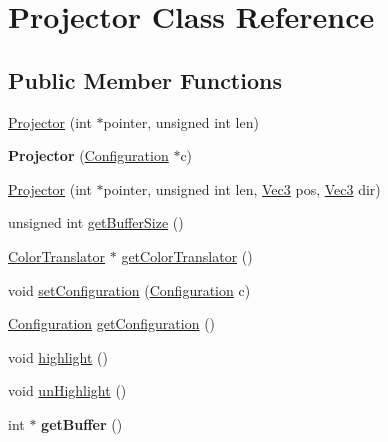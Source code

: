 \hypertarget{classProjector}{
\section{Projector Class Reference}
\label{classProjector}
}
\subsection*{Public Member Functions}
\begin{DoxyCompactItemize}
\item 
\hyperlink{classProjector_ac3b7b98ff0014b2c94f1f0038381f78a}{Projector} (int $\ast$pointer, unsigned int len)
\item 
\hypertarget{classProjector_a81eb429cd0c4659149a563bf7aaba8f5}{
{\bfseries Projector} (\hyperlink{classConfiguration}{Configuration} $\ast$c)}
\label{classProjector_a81eb429cd0c4659149a563bf7aaba8f5}

\item 
\hyperlink{classProjector_a39d6c9ed1b6cb029aaf7df4586e6af8a}{Projector} (int $\ast$pointer, unsigned int len, \hyperlink{structVec3}{Vec3} pos, \hyperlink{structVec3}{Vec3} dir)
\item 
unsigned int \hyperlink{classProjector_a8714a339afd4da16f7949dfde0c30b0a}{getBufferSize} ()
\item 
\hyperlink{classColorTranslator}{ColorTranslator} $\ast$ \hyperlink{classProjector_aaf340dde1e1a590742200007e4aecd02}{getColorTranslator} ()
\item 
void \hyperlink{classProjector_a500a8dbee7f243014dc9e8487fee69db}{setConfiguration} (\hyperlink{classConfiguration}{Configuration} c)
\item 
\hyperlink{classConfiguration}{Configuration} \hyperlink{classProjector_a54417b48fb015e507628d5feb75bfccc}{getConfiguration} ()
\item 
void \hyperlink{classProjector_a81a631412be8114bde82a155eab5279a}{highlight} ()
\item 
void \hyperlink{classProjector_acf0914f15c887e09aef49a7c13a5e1cd}{unHighlight} ()
\item 
\hypertarget{classProjector_afcf269fbc38d9c73188aefedf4010e09}{
int $\ast$ {\bfseries getBuffer} ()}
\label{classProjector_afcf269fbc38d9c73188aefedf4010e09}


\end{DoxyCompactItemize}

